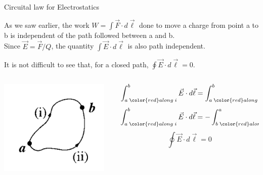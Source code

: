 %
%
%

\begin{frame}{Circuital law for Electrostatics}

As we saw earlier, the work $W = \int \vec{F} \cdot d\vec{\ell}$
done to move a charge from point a to b is independent of the path followed between a and b.\\
\vspace{0.2cm}
Since $\vec{E} = \vec{F}/Q$, the quantity $\int \vec{E} \cdot d\vec{\ell}$ is also path independent.\\
\vspace{0.2cm}

It is not difficult to see that, for a closed path, $\oint \vec{E} \cdot d\vec{\ell} = 0$.\\
\vspace{0.3cm}

\begin{columns}
  \begin{column}{0.35\textwidth}
   \begin{center}
     \includegraphics[width=0.95\textwidth]{./images/schematics/closed_path_integral_of_electric_field_is_0.png}
   \end{center}
  \end{column}
  \begin{column}{0.65\textwidth}
    \begin{equation*}
       \int_{a\;{\color{red}along\;i}}^{b} \vec{E} \cdot d\vec{\ell} = \int_{a\;{\color{red}along\;ii}}^{b} \vec{E} \cdot d\vec{\ell} \Rightarrow
    \end{equation*}
    \begin{equation*}
       \int_{a\;{\color{red}along\;i}}^{b} \vec{E} \cdot d\vec{\ell} = - \int_{b\;{\color{red}along\;ii}}^{a} \vec{E} \cdot d\vec{\ell} \Rightarrow
    \end{equation*}
    \begin{equation*}
       \oint \vec{E} \cdot d\vec{\ell} = 0
    \end{equation*}
  \end{column}
\end{columns}

\end{frame}


